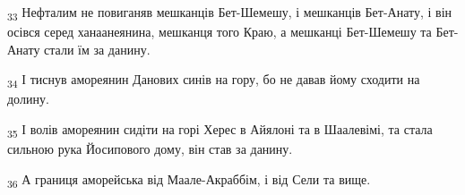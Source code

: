 \begin{tcolorbox}
\textsubscript{33} Нефталим не повиганяв мешканців Бет-Шемешу, і мешканців Бет-Анату, і він осівся серед ханаанеянина, мешканця того Краю, а мешканці Бет-Шемешу та Бет-Анату стали їм за данину.
\end{tcolorbox}
\begin{tcolorbox}
\textsubscript{34} І тиснув амореянин Данових синів на гору, бо не давав йому сходити на долину.
\end{tcolorbox}
\begin{tcolorbox}
\textsubscript{35} І волів амореянин сидіти на горі Херес в Айялоні та в Шаалевімі, та стала сильною рука Йосипового дому, він став за данину.
\end{tcolorbox}
\begin{tcolorbox}
\textsubscript{36} А границя аморейська від Маале-Акраббім, і від Сели та вище.
\end{tcolorbox}
